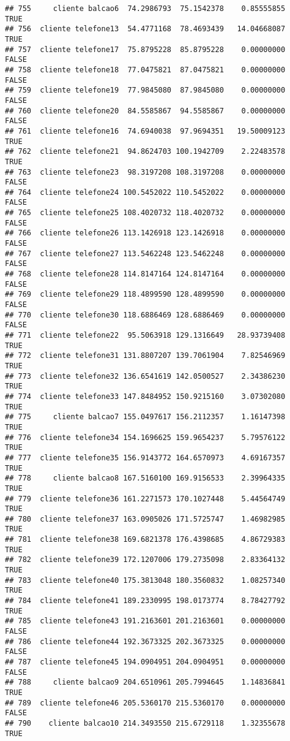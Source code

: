 \documentclass[
]{article}
\begin{document}
\begin{verbatim}
## 755     cliente balcao6  74.2986793  75.1542378    0.85555855     TRUE
## 756  cliente telefone13  54.4771168  78.4693439   14.04668087     TRUE
## 757  cliente telefone17  75.8795228  85.8795228    0.00000000    FALSE
## 758  cliente telefone18  77.0475821  87.0475821    0.00000000    FALSE
## 759  cliente telefone19  77.9845080  87.9845080    0.00000000    FALSE
## 760  cliente telefone20  84.5585867  94.5585867    0.00000000    FALSE
## 761  cliente telefone16  74.6940038  97.9694351   19.50009123     TRUE
## 762  cliente telefone21  94.8624703 100.1942709    2.22483578     TRUE
## 763  cliente telefone23  98.3197208 108.3197208    0.00000000    FALSE
## 764  cliente telefone24 100.5452022 110.5452022    0.00000000    FALSE
## 765  cliente telefone25 108.4020732 118.4020732    0.00000000    FALSE
## 766  cliente telefone26 113.1426918 123.1426918    0.00000000    FALSE
## 767  cliente telefone27 113.5462248 123.5462248    0.00000000    FALSE
## 768  cliente telefone28 114.8147164 124.8147164    0.00000000    FALSE
## 769  cliente telefone29 118.4899590 128.4899590    0.00000000    FALSE
## 770  cliente telefone30 118.6886469 128.6886469    0.00000000    FALSE
## 771  cliente telefone22  95.5063918 129.1316649   28.93739408     TRUE
## 772  cliente telefone31 131.8807207 139.7061904    7.82546969     TRUE
## 773  cliente telefone32 136.6541619 142.0500527    2.34386230     TRUE
## 774  cliente telefone33 147.8484952 150.9215160    3.07302080     TRUE
## 775     cliente balcao7 155.0497617 156.2112357    1.16147398     TRUE
## 776  cliente telefone34 154.1696625 159.9654237    5.79576122     TRUE
## 777  cliente telefone35 156.9143772 164.6570973    4.69167357     TRUE
## 778     cliente balcao8 167.5160100 169.9156533    2.39964335     TRUE
## 779  cliente telefone36 161.2271573 170.1027448    5.44564749     TRUE
## 780  cliente telefone37 163.0905026 171.5725747    1.46982985     TRUE
## 781  cliente telefone38 169.6821378 176.4398685    4.86729383     TRUE
## 782  cliente telefone39 172.1207006 179.2735098    2.83364132     TRUE
## 783  cliente telefone40 175.3813048 180.3560832    1.08257340     TRUE
## 784  cliente telefone41 189.2330995 198.0173774    8.78427792     TRUE
## 785  cliente telefone43 191.2163601 201.2163601    0.00000000    FALSE
## 786  cliente telefone44 192.3673325 202.3673325    0.00000000    FALSE
## 787  cliente telefone45 194.0904951 204.0904951    0.00000000    FALSE
## 788     cliente balcao9 204.6510961 205.7994645    1.14836841     TRUE
## 789  cliente telefone46 205.5360170 215.5360170    0.00000000    FALSE
## 790    cliente balcao10 214.3493550 215.6729118    1.32355678     TRUE

\end{verbatim}
\end{document}

